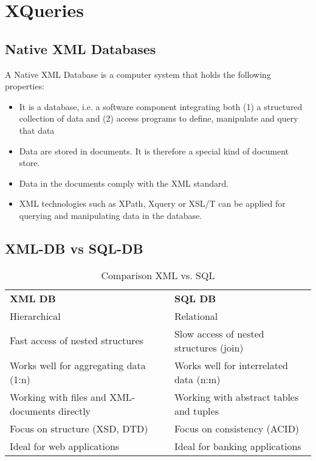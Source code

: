 \chapter{XQueries}
\section{Native XML Databases}
A Native XML Database is a computer system that holds the following properties:
\begin{itemize}
  \item It is a database, i.e. a software component integrating both (1) a structured collection of data and (2) access programs to define, manipulate and query that data
  \item Data are stored in documents. It is therefore a special kind of document store.
  \item Data in the documents comply with the XML standard.
  \item XML technologies such as XPath, Xquery or XSL/T can be applied for querying and manipulating data in the database.
\end{itemize}


\section{XML-DB vs SQL-DB}

\begin{table}[htbp]
\centering
\caption{Comparison XML vs. SQL}
\begin{tabular}{ll}
\textbf{XML DB}         & \textbf{SQL DB}        \\ \cline{1-2}
\multicolumn{1}{|l|}{Hierarchical} & \multicolumn{1}{l|}{Relational} \\ \cline{1-2}
\multicolumn{1}{|l|}{Fast access of nested structures} & \multicolumn{1}{l|}{Slow access of nested structures (join)} \\ \cline{1-2}
\multicolumn{1}{|l|}{Works well for aggregating data (1:n)} & \multicolumn{1}{l|}{Works well for interrelated data (n:m) } \\ \cline{1-2}
\multicolumn{1}{|l|}{Working with files and XML-documents directly } & \multicolumn{1}{l|}{Working with abstract tables and tuples} \\ \cline{1-2}
\multicolumn{1}{|l|}{Focus on structure (XSD, DTD)} & \multicolumn{1}{l|}{Focus on consistency (ACID)} \\ \cline{1-2}
\multicolumn{1}{|l|}{Ideal for web applications} & \multicolumn{1}{l|}{Ideal for banking applications} \\ \cline{1-2}

\end{tabular}
\end{table}


